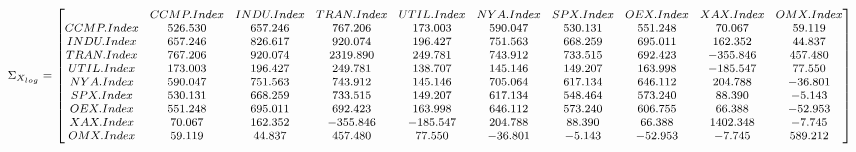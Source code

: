 \documentclass{article}
\begin{document}
\begin{equation*}
\begin{medsize}
\Sigma_{X_{log}}=%
\begin{bmatrix}{}
  & CCMP.Index & INDU.Index & TRAN.Index & UTIL.Index & NYA.Index & SPX.Index & OEX.Index & XAX.Index & OMX.Index \\ 
 CCMP.Index & 526.530 & 657.246 & 767.206 & 173.003 & 590.047 & 530.131 & 551.248 & 70.067 & 59.119 \\ 
  INDU.Index & 657.246 & 826.617 & 920.074 & 196.427 & 751.563 & 668.259 & 695.011 & 162.352 & 44.837 \\ 
  TRAN.Index & 767.206 & 920.074 & 2319.890 & 249.781 & 743.912 & 733.515 & 692.423 & -355.846 & 457.480 \\ 
  UTIL.Index & 173.003 & 196.427 & 249.781 & 138.707 & 145.146 & 149.207 & 163.998 & -185.547 & 77.550 \\ 
  NYA.Index & 590.047 & 751.563 & 743.912 & 145.146 & 705.064 & 617.134 & 646.112 & 204.788 & -36.801 \\ 
  SPX.Index & 530.131 & 668.259 & 733.515 & 149.207 & 617.134 & 548.464 & 573.240 & 88.390 & -5.143 \\ 
  OEX.Index & 551.248 & 695.011 & 692.423 & 163.998 & 646.112 & 573.240 & 606.755 & 66.388 & -52.953 \\ 
  XAX.Index & 70.067 & 162.352 & -355.846 & -185.547 & 204.788 & 88.390 & 66.388 & 1402.348 & -7.745 \\ 
  OMX.Index & 59.119 & 44.837 & 457.480 & 77.550 & -36.801 & -5.143 & -52.953 & -7.745 & 589.212 \\ 
  \end{bmatrix}
\end{medsize}
\end{equation*}
%
%
\end{document}
